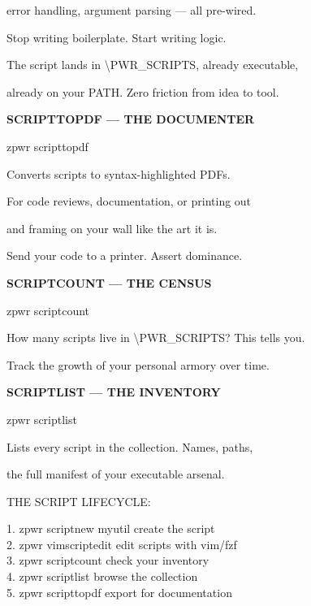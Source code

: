 \documentclass[11pt,a4paper,twoside]{book}
\begin{document}
error handling, argument parsing — all pre-wired.

Stop writing boilerplate. Start writing logic.

The script lands in \textbackslash{}PWR\_SCRIPTS, already executable,

already on your PATH. Zero friction from idea to tool.


\vspace{12pt}
{\bfseries\color{neonyellow} SCRIPTTOPDF — THE DOCUMENTER}\vspace{4pt}

\begin{codebox}
zpwr scripttopdf\\
\end{codebox}

Converts scripts to syntax-highlighted PDFs.

For code reviews, documentation, or printing out

and framing on your wall like the art it is.

Send your code to a printer. Assert dominance.


\vspace{12pt}
{\bfseries\color{neonyellow} SCRIPTCOUNT — THE CENSUS}\vspace{4pt}

\begin{codebox}
zpwr scriptcount\\
\end{codebox}

How many scripts live in \textbackslash{}PWR\_SCRIPTS? This tells you.

Track the growth of your personal armory over time.


\vspace{12pt}
{\bfseries\color{neonyellow} SCRIPTLIST — THE INVENTORY}\vspace{4pt}

\begin{codebox}
zpwr scriptlist\\
\end{codebox}

Lists every script in the collection. Names, paths,

the full manifest of your executable arsenal.

THE SCRIPT LIFECYCLE:

\begin{codebox}
1. zpwr scriptnew myutil     create the script\\
2. zpwr vimscriptedit        edit scripts with vim/fzf\\
3. zpwr scriptcount          check your inventory\\
4. zpwr scriptlist           browse the collection\\
5. zpwr scripttopdf          export for documentation\\
\end{codebox}
\end{document}
